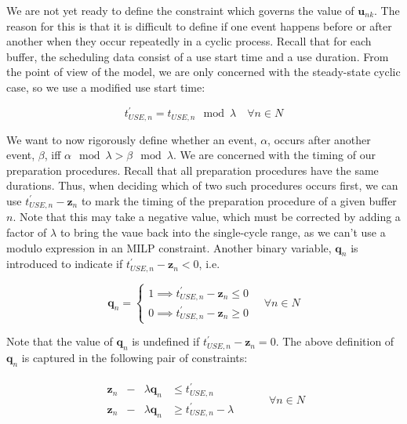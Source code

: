 We are not yet ready to define the constraint which governs the value of
$\boldsymbol{u}_{nk}$.
The reason for this is that it is difficult to define if one event happens
before or after another when they occur repeatedly in a cyclic process.
Recall that for each buffer, the scheduling data consist of a use start time
and a use duration.
From the point of view of the model, we are only concerned with the 
steady-state cyclic case, so we use a modified use start time:

\begin{equation}
    t_{USE,n}^{\prime} = t_{USE,n} \mod \lambda \quad \forall n \in N
\end{equation}

We want to now rigorously define whether an event, $\alpha$, occurs after
another event, $\beta$, iff $ \alpha \mod \lambda > \beta \mod \lambda $.
We are concerned with the timing of our preparation procedures.
Recall that all preparation procedures have the same durations.
Thus, when deciding which of two such procedures occurs first, we can use 
$ t_{USE,n}^{\prime} - \boldsymbol{z}_{n} $ to mark the timing of the
preparation procedure of a given buffer $n$.
Note that this may take a negative value, which must be corrected by adding a
factor of $\lambda$ to bring the vaue back into the single-cycle range, as we
can't use a modulo expression in an MILP constraint.
Another binary variable, $ \boldsymbol{q}_{n} $ is introduced to indicate if
$ t_{USE,n}^{\prime} - \boldsymbol{z}_{n} < 0 $, i.e. 

\begin{equation}
    \boldsymbol{q}_{n} =
    \begin{cases}
        1 \implies t_{USE,n}^{\prime} - \boldsymbol{z}_{n} \le 0\\
        0 \implies t_{USE,n}^{\prime} - \boldsymbol{z}_{n} \ge 0
    \end{cases}
    \quad \forall n \in N
\end{equation}

Note that the value of $ \boldsymbol{q}_{n} $ is undefined if 
$ t_{USE,n}^{\prime} - \boldsymbol{z}_{n} = 0 $.
The above definition of $ \boldsymbol{q}_{n} $ is captured in the following
pair of constraints:

\begin{equation}
    \begin{split}
        \begin{alignedat}{2}
            \boldsymbol{z}_{n} & {}-{} & \lambda \boldsymbol{q}_{n} & \le 
            t_{USE,n}^{\prime}\\
            \boldsymbol{z}_{n} & {}-{} & \lambda \boldsymbol{q}_{n} & \ge 
            t_{USE,n}^{\prime} - \lambda
        \end{alignedat}
    \end{split}
    \quad\quad
    \begin{split}
        \forall n \in N
    \end{split}
\end{equation}


